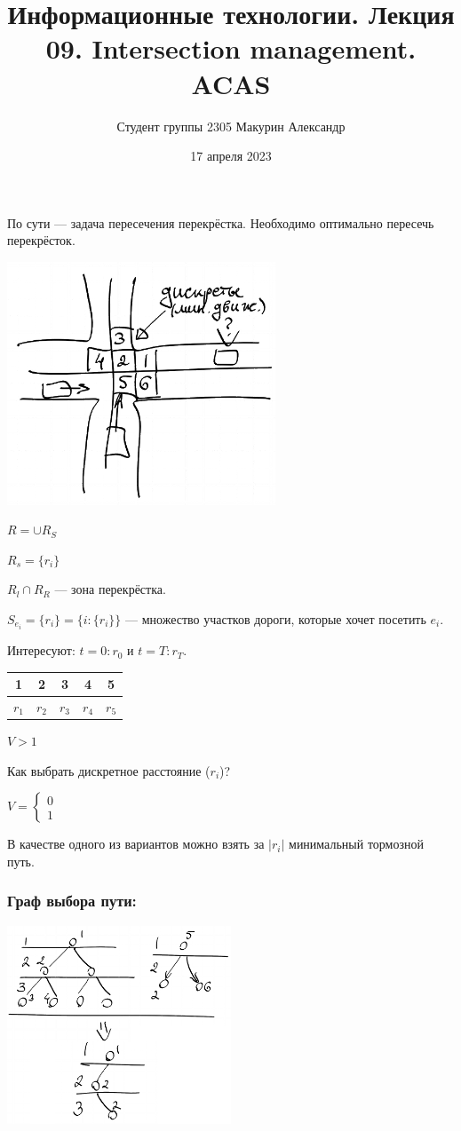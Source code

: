 \documentclass{article}
\title{Информационные технологии. Лекция 09. Intersection management. ACAS}
\author{Студент группы 2305 Макурин Александр}
\date{17 апреля 2023}
\begin{document}
\maketitle
По сути — задача пересечения перекрёстка. Необходимо оптимально пересечь перекрёсток.

\includegraphics[width=0.6\textwidth]{graphics/pic01.png}

$R = \cup R_S$

$R_s = \{r_i\}$

$R_l \cap R_R$ — зона перекрёстка.

$S_{e_i} = \{r_i\} = \{i : \{r_i\}\}$ — множество участков дороги, которые хочет посетить $e_i$.

Интересуют: $t = 0 : r_0$ и $t = T : r_T$.

\begin{tabular}{|c|c|c|c|c|}
    \hline
    1     & 2     & 3     & 4     & 5     \\
    \hline
    $r_1$ & $r_2$ & $r_3$ & $r_4$ & $r_5$ \\
    \hline
\end{tabular} $V > 1$

Как выбрать дискретное расстояние ($r_i$)?

$V = \begin{cases} 0 \\ 1 \end{cases}$

В качестве одного из вариантов можно взять за $|r_i|$ минимальный тормозной путь.

\subsubsection*{Граф выбора пути:}
\includegraphics[width=0.5\textwidth]{graphics/pic02.png}
\end{document}
